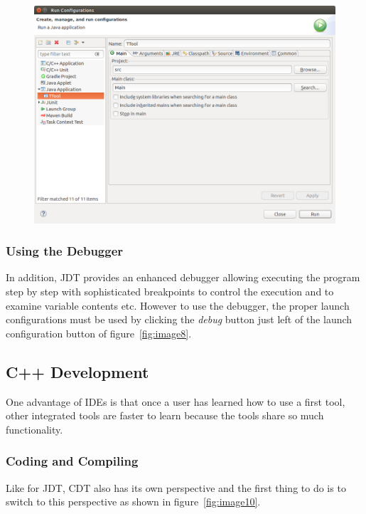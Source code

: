 \documentclass[12pt]{article}
\begin{document}
\begin{figure}[H]
\begin{center}
\includegraphics[width=\textwidth]{images/image9.png}
\end{center}
\caption{}
\label{fig:image9}
\end{figure}

\subsubsection{Using the Debugger}

In addition, JDT provides an enhanced debugger allowing executing the program
step by step with sophisticated breakpoints to control the execution and to
examine variable contents etc. However to use the debugger, the proper launch
configurations must be used by clicking the \textit{debug}
button just left of the launch configuration button of figure~\ref{fig:image8}.

\subsection{C++ Development}

One advantage of IDEs is that once a user has learned how to use a first tool,
other integrated tools are faster to learn because the tools share so much
functionality.

\subsubsection{Coding and Compiling}

Like for JDT, CDT also has its own perspective and the first thing to do is to
switch to this perspective as shown in figure~\ref{fig:image10}.
\end{document}
